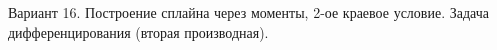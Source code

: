 \documentclass[14pt, a4paper, fleqn]{extarticle}
\begin{document}
	\tableofcontents
	\pagebreak
	Вариант 16. Построение сплайна через моменты, 2-ое краевое условие. Задача дифференцирования (вторая производная).
\end{document}
